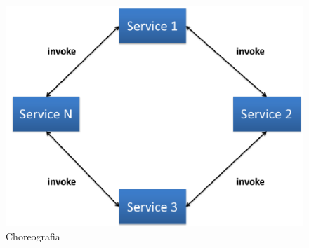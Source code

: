 \begin{figure}[!h]
	\centering
	\includegraphics[scale=0.75]{choreogragia.png} 
	\caption{Choreografia}
\end{figure}

